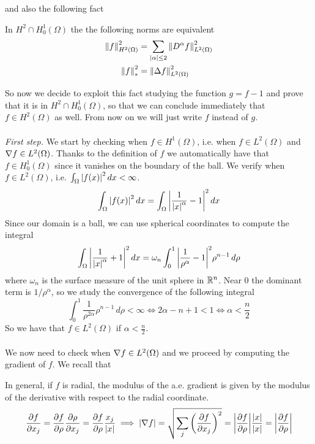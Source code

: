 and also the following fact
\begin{remark}
In $H^2 \cap H^1_0 (\Omega)$ the the following norms are equivalent
\begin{align*}
\norm{f}_{H^2(\Omega)}^2 &= \sum_{|\alpha| \leq 2} \norm{D^\alpha f}_{L^2(\Omega)}^2\\
\norm{f}^2_{*} &= \norm{\Delta f}_{L^2(\Omega)}^2 
\end{align*}
\end{remark}
So now we decide to exploit this fact studying the function $g=f-1$ and prove that it is in $H^2 \cap H^1_0(\Omega)$,
so that we can conclude immediately that \(f \in H^2(\Omega)\) as well.
From now on we will just write $f$ instead of $g$.\\
\vspace{0.1cm}\\
\textit{First step.}
We start by checking when \(f \in H^1(\Omega)\), i.e. when \(f \in L^2(\Omega)\) and \(\nabla f \in L^2(\Omega)\). 
Thanks to the definition of \(f\) we automatically have that \(f \in H^1_0(\Omega)\) since it vanishes on the boundary of the ball.
We verify when \(f \in L^2(\Omega)\), i.e. \(\int_\Omega \abs{f(x)}^2 \, dx < \infty\).
\[
    \begin{split}
        \int_\Omega \abs{f(x)}^2 \, dx = \int_\Omega \abs{\frac{1}{\abs{x}^\alpha}-1}^2 \, dx
    \end{split}
\]
Since our domain is a ball, we can use spherical coordinates to compute the integral
\begin{align*}
\int_\Omega \abs{\frac{1}{\abs{x}^\alpha}+1}^2 \, dx = \omega_n \int_0^1 \abs{\frac{1}{\rho^\alpha}-1}^2  \rho^{n-1} \, d\rho
\end{align*}
where \(\omega_n\) is the surface measure of the unit sphere in \(\mathbb{R}^n\).
Near 0 the dominant term is $1/\rho^\alpha$, so we study the convergence of the following integral
\begin{equation*}
\int_0^1 {\frac{1}{\rho^{2\alpha}} \rho^{n-1} \, d\rho < \infty \iff  2 \alpha - n + 1 < 1 \iff \alpha < \frac{n}{2}}
\end{equation*}
So we have that \(f \in L^2(\Omega)\) if \(\alpha < \frac{n}{2}\).\\
\vspace{0.1cm}\\
We now need to check when \(\nabla f \in L^2(\Omega)\) and we proceed by computing the gradient of \(f\).
We recall that 
\begin{remark}
In general, if \(f\) is radial, the modulus of the a.e. gradient is given by the modulus of the derivative with respect to the radial coordinate.
\begin{equation*}
\frac{\partial f}{\partial x_j} = \frac{\partial f}{\partial \rho} \frac{\partial \rho}{\partial x_j} = \frac{\partial f}{\partial \rho} \frac{x_j}{\abs{x}}
\implies \abs{\nabla f} = \sqrt{\sum_j \left(\frac{\partial f}{\partial x_j}\right)^2} = \abs{\frac{\partial f}{\partial \rho}} \frac{\abs{x}}{\abs{x}} = \abs{\frac{\partial f}{\partial \rho}}
\end{equation*}
\end{remark}
